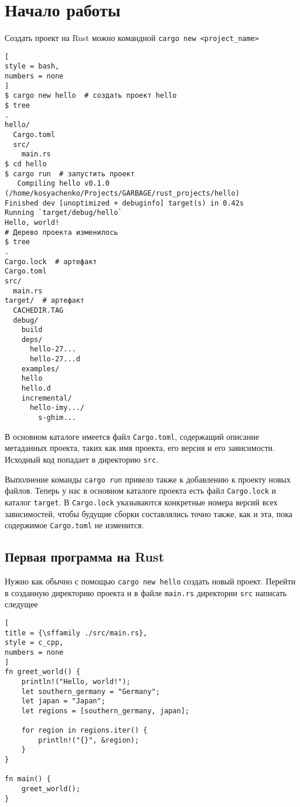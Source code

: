 \documentclass[%
	11pt,
	a4paper,
	utf8,
		]{article}
\begin{document}
\section{Начало работы}

Создать проект на Rust можно командной \texttt{cargo new <project\_name>}
\begin{lstlisting}[
style = bash,
numbers = none	
]
$ cargo new hello  # создать проект hello
$ tree 
.
hello/
  Cargo.toml
  src/
    main.rs
$ cd hello
$ cargo run  # запустить проект
   Compiling hello v0.1.0 (/home/kosyachenko/Projects/GARBAGE/rust_projects/hello)
Finished dev [unoptimized + debuginfo] target(s) in 0.42s
Running `target/debug/hello`
Hello, world!
# Дерево проекта изменилось
$ tree
.
Cargo.lock  # артефакт
Cargo.toml
src/
  main.rs
target/  # артефакт
  CACHEDIR.TAG
  debug/
    build
    deps/
      hello-27...
      hello-27...d
    examples/
    hello
    hello.d
    incremental/
      hello-imy.../
        s-ghim...
\end{lstlisting}

В основном каталоге имеется файл \texttt{Cargo.toml}, содержащий описание метаданных проекта, таких как имя проекта, его версия и его зависимости. Исходный код попадает в директорию \texttt{src}.

Выполнение команды \texttt{cargo run} привело также к добавлению к проекту новых файлов. Теперь у нас в основном каталоге проекта есть файл \texttt{Cargo.lock} и каталог \texttt{target}. В \texttt{Cargo.lock} указываются конкретные номера версий всех зависимостей, чтобы будущие сборки составлялись точно также, как и эта, пока содержимое \texttt{Cargo.toml} не изменится.

\subsection{Первая программа на Rust}

Нужно как обычно с помощью \texttt{cargo new hello} создать новый проект. Перейти в созданную директорию проекта и в файле \texttt{main.rs} директории \texttt{src} написать следущее
\begin{lstlisting}[			
title = {\sffamily ./src/main.rs},
style = c_cpp,
numbers = none
]
fn greet_world() {
    println!("Hello, world!");
    let southern_germany = "Germany";
    let japan = "Japan";
    let regions = [southern_germany, japan];
    
    for region in regions.iter() {
        println!("{}", &region);
    }
}

fn main() {
    greet_world();
}
\end{lstlisting}
\end{document}
